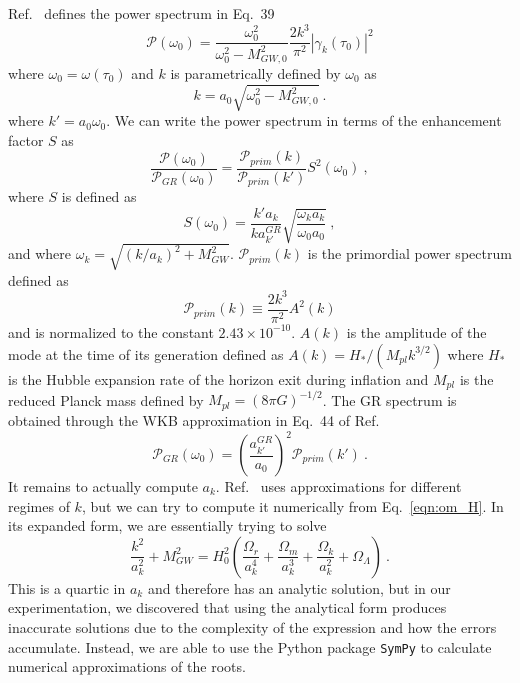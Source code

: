 \documentclass[prd,twocolumn,aps,psfig,nofootinbib,nobibnotes,superscriptaddress,preprintnumbers,times]{revtex4-2}
\begin{document}
Ref.\ \cite{Gumrukcuoglu:2012} defines the power spectrum in Eq.\ 39
\begin{equation}\label{eqn:12}
    \mathcal{P}(\omega_0)= \frac{\omega_0^2}{\omega_0^2 - M_{GW,0}^2}\frac{2k^3}{\pi^2}|\gamma_k(\tau_0)|^2
\end{equation}
where $\omega_0 = \omega(\tau_0)$ and $k$ is parametrically defined by $\omega_0$ as
\begin{equation}\label{eqn:13}
    k = a_0 \sqrt{\omega_0^2 -  M_{GW,0}^2} \ .
\end{equation}
where $k' = a_0 \omega_0$. We can write the power spectrum in terms of the enhancement factor $S$ as
\begin{equation}\label{eqn:14}
    \frac{\mathcal{P}(\omega_0)}{\mathcal{P}_{GR}(\omega_0)} = \frac{\mathcal{P}_{prim}(k)}{\mathcal{P}_{prim}(k')}S^2(\omega_0)\ ,
\end{equation}
where $S$ is defined as 
\begin{equation}\label{eqn:15}
    S(\omega_0) = \frac{k' a_k}{k a_{k'}^{GR}} \sqrt{\frac{\omega_k a_k}{\omega_0 a_0}}\ ,
\end{equation}
and where $\omega_k = \sqrt{(k/a_k)^2 + M_{GW}^2}$. $\mathcal{P}_{prim}(k)$ is the primordial power spectrum defined as 
\begin{equation}\label{eqn:16}
    \mathcal{P}_{prim}(k) \equiv \frac{2k^3}{\pi^2}A^2(k)
\end{equation}and is normalized to the constant $2.43\times 10^{-10}$. $A(k)$ is the amplitude of the mode at the time of its generation defined as $A(k) = H_*/(M_{pl} k^{3/2})$ where $H_*$ is the Hubble expansion rate of the horizon exit during inflation and $M_{pl}$ is the reduced Planck mass defined by $M_{pl} = (8\pi G)^{-1/2}$. The GR spectrum is obtained through the WKB approximation in Eq.\ 44 of Ref.\ \cite{Gumrukcuoglu:2012}
\begin{equation}\label{eqn:17}
    \mathcal{P}_{GR}(\omega_0) =  \left( \frac{a_{k'}^{GR}}{a_0}\right)^2 \mathcal{P}_{prim}(k')\ .
\end{equation}
It remains to actually compute $a_k$. Ref.\ \cite{Gumrukcuoglu:2012} uses approximations for different regimes of $k$, but we can try to compute it numerically from Eq.\ \ref{eqn:om_H}. In its expanded form, we are essentially trying to solve 
\begin{equation}\label{eqn:19}
    \frac{k^2}{a_k^2} + M_{GW}^2 = H_0^2\left(\frac{\Omega_r}{a_k^4} + \frac{\Omega_m}{a_k^3}+ \frac{\Omega_k}{a_k^2}+\Omega_\Lambda\right) \ .
\end{equation}This is a quartic in $a_k$ and therefore has an analytic solution, but in our experimentation, we discovered that using the analytical form produces inaccurate solutions due to the complexity of the expression and how the errors accumulate. Instead, we are able to use the Python package \texttt{SymPy} \cite{SymPy:2017} to calculate numerical approximations of the roots.
\end{document}
